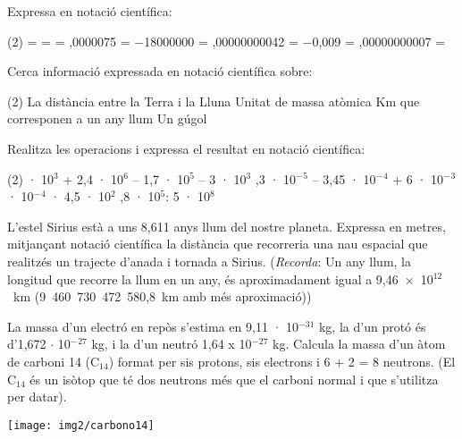 \begin{mylist}

\exer \spen Expressa en notació científica:
\begin{tasks}(2)
 =     =  
 =    ,0000075 =
\task  $-$18000000 =     ,00000000042 =
\task  $-$0,009 =    ,00000000007 =
\end{tasks}

\exer  \simbolsearch Cerca informació expressada en notació científica sobre:
\begin{tasks}(2)
\task  La distància entre la Terra i la Lluna  \task  Unitat de massa atòmica
\task  Km que corresponen a un any llum  \task  Un gúgol   
\end{tasks}


\exer[1]  Realitza les operacions i expressa el resultat en notació científica:
\begin{tasks}(2)
 · 10${}^{3}$ + 2,4 · 10${}^{6}$ -- 1,7 · 10${}^{5}$ -- 3 · 10${}^{3}$ ,3 · 10${}^{-}$${}^{5}$ -- 3,45 · 10${}^{-}$${}^{4}$ + 6 · 10${}^{-}$${}^{3}$
 · 10${}^{-}$${}^{4}$ · 4,5 · 10${}^{2 }$   ,8 · 10${}^{5}$: 5 · 10${}^{8}$
\end{tasks}


\exer[1]  L'estel Sirius està a uns 8,611 anys llum del nostre planeta. Expressa en metres, mitjançant notació científica la distància que recorreria una nau espacial que realitzés un trajecte d'anada i tornada a Sirius. (\textit{Recorda}: Un any llum, la longitud que recorre la llum en un any, és aproximadament igual a  9,46~$\times$~10${}^{12}$~km (9~460~730~472~580,8~km amb més aproximació))

 

\vspace{-2cm}
\exer[1]  \begin{minipage}[t]{0.7\textwidth}  La massa d'un electró en repòs s'estima en 9,11 · 10${}^{-31}$ kg, la d'un protó és d'1,672 $\cdot$ 10${}^{-}$${}^{27}$ kg, i la d'un neutró 1,64 x 10${}^{-}$${}^{27}$ kg. Calcula la massa d'un àtom de carboni 14 (C${}_{14}$) format per sis protons, sis electrons i 6 + 2 = 8 neutrons. (El C${}_{14}$ és un isòtop que té dos neutrons més que el carboni normal i que s'utilitza per datar).
\end{minipage}
\begin{minipage}{0.3\textwidth}
\centering
\vspace{2cm}
\texttt{[image: img2/carbono14]}
\end{minipage}


\end{mylist}

